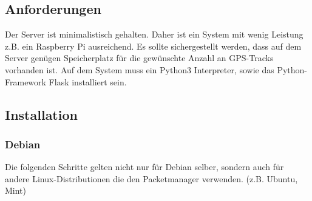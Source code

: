\documentclass{article}
\begin{document}
\subsection{Anforderungen}
Der Server ist minimalistisch gehalten. Daher ist ein System mit wenig 
Leistung z.B. ein Raspberry Pi ausreichend. Es sollte sichergestellt 
werden, dass auf dem Server genügen Speicherplatz für die gewünschte Anzahl an 
GPS-Tracks vorhanden ist. Auf dem System muss ein Python3 Interpreter, sowie das 
Python-Framework Flask installiert sein.
\subsection{Installation}
\subsubsection{Debian}
Die folgenden Schritte gelten nicht nur für Debian selber, sondern auch für andere 
Linux-Distributionen die den Packetmanager  verwenden. (z.B. Ubuntu, Mint)\par
\end{document}
